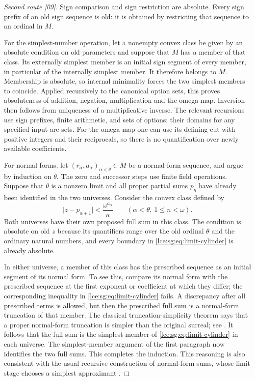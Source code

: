 \documentclass[11pt,letterpaper]{article}
\numberwithin{equation}{section}
\theoremstyle{definition}
\theoremstyle{remark}
\newcommand{\abs}[1]{\lvert#1\rvert}
\newcommand{\src}[1]{\textup{\textsf{\small[#1]}}}%
\begin{document}
\begin{proof}[Second route \src{09}]
Sign comparison and sign restriction are absolute. Every sign prefix of an
old sign sequence is old: it is obtained by restricting that sequence to an
ordinal in $M$.

For the simplest-number operation, let a nonempty convex class be given by
an absolute condition on old parameters and suppose that $M$ has a member
of that class. Its externally simplest member is an initial sign segment of
every member, in particular of the internally simplest member. It therefore
belongs to $M$. Membership is absolute, so internal minimality forces the
two simplest members to coincide. Applied recursively to the canonical
option sets, this proves absoluteness of addition, negation, multiplication
and the omega-map. Inversion then follows from uniqueness of a
multiplicative inverse. The relevant recursions use sign prefixes, finite
arithmetic, and sets of options; their domains for any specified input are
sets. For the omega-map one can use its defining cut with positive integers
and their reciprocals, so there is no quantification over newly available
coefficients.

For normal forms, let $(r_\alpha,a_\alpha)_{\alpha<\theta}\in M$ be a
normal-form sequence, and argue by induction on $\theta$. The zero and
successor steps use finite field operations. Suppose that $\theta$ is a
nonzero limit and all proper partial sums $p_\eta$ have already been
identified in the two universes. Consider the convex class defined by
\begin{equation}\label{lce:sg:eq:limit-cylinder}
 \abs{z-p_{\alpha+1}}<\frac{\omega^{a_\alpha}}{n}
 \qquad(\alpha<\theta,\ 1\le n<\omega).
\end{equation}
Both universes have their own proposed full sum in this class. The
condition is absolute on old $z$ because its quantifiers range over the old
ordinal $\theta$ and the ordinary natural numbers, and every boundary in
\eqref{lce:sg:eq:limit-cylinder} is already absolute.

In either universe, a member of this class has the prescribed sequence as
an initial segment of its normal form. To see this, compare its normal form
with the prescribed sequence at the first exponent or coefficient at which
they differ; the corresponding inequality in
\eqref{lce:sg:eq:limit-cylinder} fails. A discrepancy after all prescribed
terms is allowed, but then the prescribed full sum is a normal-form
truncation of that member. The classical truncation-simplicity theorem says
that a proper normal-form truncation is simpler than the original surreal;
see \cite[Theorem~19.2(4)]{Berarducci}. It follows that the full sum is the
simplest member of \eqref{lce:sg:eq:limit-cylinder} in each universe. The
simplest-member argument of the first paragraph now identifies the two full
sums. This completes the induction. This reasoning is also consistent with
the usual recursive construction of normal-form sums, whose limit stage
chooses a simplest approximant \cite[Theorem~10.2]{Berarducci}.


\end{proof}
\end{document}
